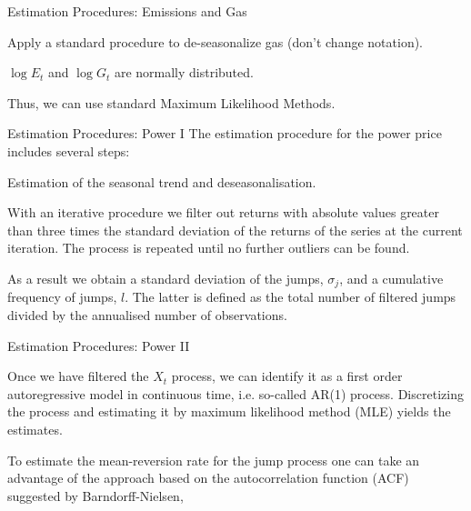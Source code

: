 {Estimation Procedures: Emissions and Gas}


	Apply a standard procedure to de-seasonalize gas (don't change notation).

	$\log E_t$ and $\log G_t$ are normally distributed.

	Thus, we can use standard Maximum Likelihood Methods.


{Estimation Procedures: Power I}
The estimation procedure for the power price includes several steps:


	Estimation of the seasonal trend and deseasonalisation.

	With an iterative procedure we filter out returns with absolute values greater than three times the standard deviation of the returns of the series at the current iteration. The process is repeated until no further outliers can be found.

	As a result we obtain a standard deviation of the jumps, $\sigma_j$, and a cumulative frequency of jumps, $l$. The latter is defined as the total number of filtered jumps divided by the annualised number of observations.


{Estimation Procedures: Power II}


	Once we have filtered the $X_t$ process, we can identify it as a first order autoregressive model in continuous time, i.e. so-called AR(1) process. Discretizing the process and estimating it by maximum likelihood method (MLE) yields the estimates.
%

	To estimate the mean-reversion rate for the jump process one can take an advantage of the approach based on the autocorrelation function (ACF) suggested by Barndorff-Nielsen, %


